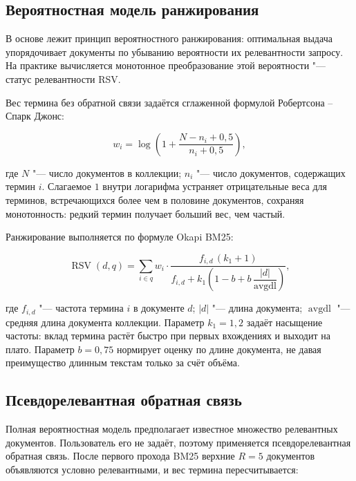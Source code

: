 \subsection{Вероятностная модель ранжирования}

В основе лежит принцип вероятностного ранжирования: оптимальная выдача упорядочивает документы по убыванию вероятности их релевантности запросу. На практике вычисляется монотонное преобразование этой вероятности "--- статус релевантности RSV.

Вес термина без обратной связи задаётся сглаженной формулой Робертсона -- Спарк Джонс:

\begin{equation}
	w_i = \log\left(1 + \frac{N - n_i + 0{,}5}{n_i + 0{,}5}\right),
	\label{eq:rsj}
\end{equation}

где $N$ "--- число документов в коллекции; $n_i$ "--- число документов, содержащих термин $i$. Слагаемое $1$ внутри логарифма устраняет отрицательные веса для терминов, встречающихся более чем в половине документов, сохраняя монотонность: редкий термин получает больший вес, чем частый.

Ранжирование выполняется по формуле Okapi BM25:

\begin{equation}
	\operatorname{RSV}(d,q) = \sum_{i \in q} w_i \cdot
	\frac{f_{i,d}\,(k_1 + 1)}{f_{i,d} + k_1\left(1 - b + b\,\dfrac{|d|}{\operatorname{avgdl}}\right)},
	\label{eq:bm25}
\end{equation}

где $f_{i,d}$ "--- частота термина $i$ в документе $d$; $|d|$ "--- длина документа; $\operatorname{avgdl}$ "--- средняя длина документа коллекции. Параметр $k_1 = 1{,}2$ задаёт насыщение частоты: вклад термина растёт быстро при первых вхождениях и выходит на плато. Параметр $b = 0{,}75$ нормирует оценку по длине документа, не давая преимущество длинным текстам только за счёт объёма.

\subsection{Псевдорелевантная обратная связь}

Полная вероятностная модель предполагает известное множество релевантных документов. Пользователь его не задаёт, поэтому применяется псевдорелевантная обратная связь. После первого прохода BM25 верхние $R = 5$ документов объявляются условно релевантными, и вес термина пересчитывается:

